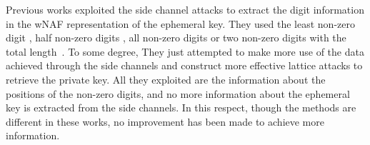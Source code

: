 %



Previous works exploited the side channel attacks to extract the digit information in the wNAF representation of the ephemeral key.
They used the least non-zero digit \cite{Benger2014}, half non-zero digits \cite{Van2015}, all non-zero digits \cite{Fan2016} or two non-zero digits with the total length~\cite{Wang2017}.
To some degree,
They just attempted to make more use of the data achieved through the side channels and construct more effective lattice attacks to retrieve the private key.
All they exploited are the information about the positions of the non-zero digits,
 and no more information about the ephemeral key is extracted from the side channels.
In this respect, though the methods are different in these works, no improvement has been made to achieve more information.

